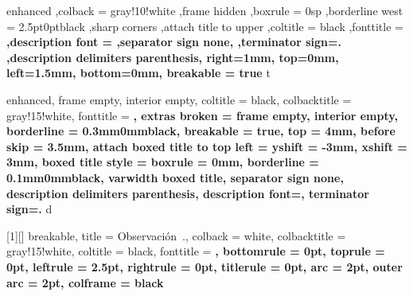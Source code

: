 \theoremstyle{definition}

\newtheorem{lemma}{Lema}[section]
\newtheorem{example}{Ejemplo}[section]
\newtheorem{theorem}{Teorema}[section]
\newtheorem{problem}{Problema}[section]
\newtheorem{property}{Propiedad}[section]
\newtheorem{exercise}{Ejercicio}[section]
\newtheorem{corollary}{Corolario}[section]
\newtheorem{definition}{Definición}[section]

\newtheorem*{note}{Nota}
\newtheorem*{hint}{Pista}

\newenvironment{solution}[1][]
{
    \begin{proof}[\textnormal{\textbf{Solución\ifthenelse{\equal{#1}{}}{}{ #1}}}]
    }{
    \end{proof}
}


{
    enhanced
    ,colback = gray!10!white
    ,frame hidden
    ,boxrule = 0sp
    ,borderline west = {2.5pt}{0pt}{black}
    ,sharp corners
    ,attach title to upper
    ,coltitle = black
    ,fonttitle = \bfseries
    ,description font = \mdseries
    ,separator sign none,
    ,terminator sign={.\hspace{2mm}}
    ,description delimiters parenthesis,
    right=1mm,
    top=0mm,
    left=1.5mm,
    bottom=0mm,
    breakable = true
}
{t}



{
    enhanced,
    frame empty,
    interior empty,
    coltitle = black,
    colbacktitle = gray!15!white,
    fonttitle = \bfseries,
    extras broken = {frame empty, interior empty},
    borderline = {0.3mm}{0mm}{black},
    breakable = true,
    top = 4mm,
    before skip = 3.5mm,
    attach boxed title to top left = {yshift = -3mm, xshift = 3mm},
    boxed title style = {boxrule = 0mm, borderline = {0.1mm}{0mm}{black}},
    varwidth boxed title,
    separator sign none, description delimiters parenthesis,
    description font=\bfseries,
    terminator sign={.\hspace{1mm}}
}
{d}


[1][]
{
    breakable,
    title = Observación~\thetcbcounter.,
    colback = white,
    colbacktitle = gray!15!white,
    coltitle = black,
    fonttitle = \bfseries,
    bottomrule = 0pt,
    toprule = 0pt,
    leftrule = 2.5pt,
    rightrule = 0pt,
    titlerule = 0pt,
    arc = 2pt,
    outer arc = 2pt,
    colframe = black
}


